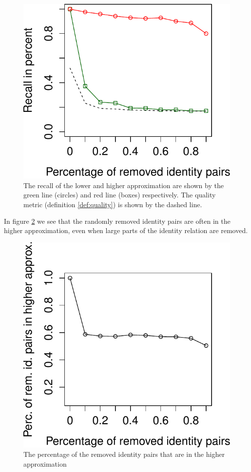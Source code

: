 \begin{figure}
\centering
\includegraphics[width=0.8\linewidth]{./img/recall_quality}
\caption{
  The recall of the lower and higher approximation
    are shown by the green line (circles) and red line (boxes) respectively.
  The quality metric (definition \ref{def:quality})
    is shown by the dashed line.
}
\label{fig:recall_quality}
\end{figure}

In figure \ref{fig:in_higher}
  we see that the randomly removed identity pairs are often
  in the higher approximation, even when large parts of
  the identity relation are removed.

\begin{figure}
\centering
\includegraphics[width=0.8\linewidth]{./img/in_higher}
\caption{
  The percentage of the removed identity pairs that are in the higher approximation
}
\label{fig:in_higher}
\end{figure}

